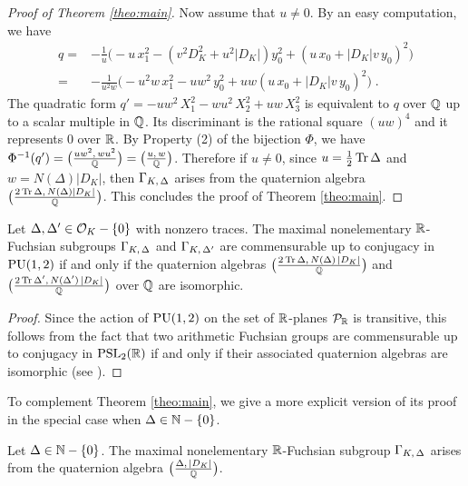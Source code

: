 \documentclass[11pt]{article}
\begin{document}
\begin{proof}[Proof of Theorem \ref{theo:main}]
\smallskip
Now assume that $u\neq 0$. By an easy computation, we have
\begin{align*}
q= & -\frac{1}{u}\big(- u\,x_1^2-(v^2D_K^2+u^2|D_K|)y_0^2+
(u\,x_0+|D_K|v\,y_0)^2\big)\\ =& 
-\frac{1}{u^2w}\big(- u^2w\,x_1^2-uw^2\,y_0^2+
uw(u\,x_0+|D_K|v\,y_0)^2\big) \;.
\end{align*} 
The quadratic form $q'=- uw^2\,X_1^2 -wu^2\,X_2^2+uw\,X_3^2$ is
equivalent to $q$ over ${\mathbb Q}$ up to a scalar multiple in ${\mathbb Q}$. Its
discriminant is the rational square $(uw)^4$ and it represents $0$
over ${\mathbb R}$.  By Property (2) of the bijection $\Phi$, we have
$\Phi^{-1}(q')= \big(\frac{uw^2,\,wu^2}{{\mathbb Q}}\big) =
\big(\frac{u,\,w}{{\mathbb Q}}\big)$.  Therefore if $u\neq0$, since
$u=\frac{1}{2}\operatorname{Tr}\Delta$ and $w=N(\Delta)|D_K|$, then
$\Gamma_{K,\,\Delta}$ arises from the quaternion algebra
$\big(\frac{2\operatorname{Tr}\Delta,\,N(\Delta)|D_K|}{{\mathbb Q}}\big)$.  This concludes
the proof of Theorem \ref{theo:main}.  
\end{proof}


\bcoro \label{coro:uniqueness}
Let $\Delta,\Delta'\in {\cal O}_K-\{0\}$ with nonzero traces. The
maximal nonelementary ${\mathbb R}$-Fuchsian subgroups $\Gamma_{K,\,\Delta}$ and
$\Gamma_{K,\,\Delta'}$ are commensurable up to conjugacy in $\operatorname{PU}(1,2)$ if
and only if the quaternion algebras $\big(\frac{2 \operatorname{Tr}\Delta ,\,
  N(\Delta) \,|D_K|}{{\mathbb Q}}\big)$ and $\big(\frac{2 \operatorname{Tr}\Delta' ,\,
  N(\Delta') \,|D_K|}{{\mathbb Q}}\big)$ over ${\mathbb Q}$ are isomorphic.  
\ecoro

\begin{proof} 
Since the action of $\operatorname{PU}(1,2)$ on the set of ${\mathbb R}$-planes ${\cal P}_{\mathbb R}$ is
transitive, this follows from the fact that two arithmetic Fuchsian
groups are commensurable up to conjugacy in $\operatorname{PSL}_2({\mathbb R})$ if and only
if their associated quaternion algebras are isomorphic (see
\cite{Takeuchi75}).  \end{proof}

To complement Theorem \ref{theo:main}, we give a more explicit version
of its proof in the special case when $\Delta \in{\mathbb N} -\{0\}$.


\bprop \label{prop:quaternionalgebraarising}
Let $\Delta\in{\mathbb N}-\{0\}$. The maximal nonelementary ${\mathbb R}$-Fuchsian
subgroup $\Gamma_{K,\,\Delta}$ arises from the quaternion algebra
$\big(\frac{\Delta,\,|D_K|}{{\mathbb Q}}\big)$.  
\eprop
\end{document}
